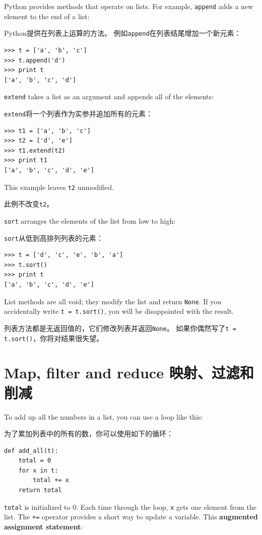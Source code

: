 \documentclass[10pt]{book}
\begin{document}
\begin{CJK}{UTF8}{gbsn}
Python provides methods that operate on lists.  For example,
{\tt append} adds a new element to the end of a list:

Python提供在列表上运算的方法。
例如{\tt append}在列表结尾增加一个新元素：

\begin{verbatim}
>>> t = ['a', 'b', 'c']
>>> t.append('d')
>>> print t
['a', 'b', 'c', 'd']
\end{verbatim}
%
{\tt extend} takes a list as an argument and appends all of
the elements:

{\tt extend}将一个列表作为实参并追加所有的元素：

\begin{verbatim}
>>> t1 = ['a', 'b', 'c']
>>> t2 = ['d', 'e']
>>> t1.extend(t2)
>>> print t1
['a', 'b', 'c', 'd', 'e']
\end{verbatim}
%
This example leaves {\tt t2} unmodified.

此例不改变{\tt t2}。

{\tt sort} arranges the elements of the list from low to high:

{\tt sort}从低到高排列列表的元素：

\begin{verbatim}
>>> t = ['d', 'c', 'e', 'b', 'a']
>>> t.sort()
>>> print t
['a', 'b', 'c', 'd', 'e']
\end{verbatim}
%
List methods are all void; they modify the list and return {\tt None}.
If you accidentally write {\tt t = t.sort()}, you will be disappointed
with the result.

列表方法都是无返回值的，它们修改列表并返回{\tt None}。
如果你偶然写了{\tt t = t.sort()}，你将对结果很失望。


\section{Map, filter and reduce 映射、过滤和削减}

To add up all the numbers in a list, you can use a loop like this:

为了累加列表中的所有的数，你可以使用如下的循环：


\begin{verbatim}
def add_all(t):
    total = 0
    for x in t:
        total += x
    return total
\end{verbatim}
%
{\tt total} is initialized to 0.  Each time through the loop,
{\tt x} gets one element from the list.  The {\tt +=} operator
provides a short way to update a variable.  This 
{\bf augmented assignment statement}:


\end{CJK}
\end{document}

